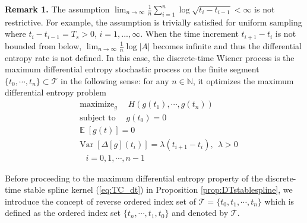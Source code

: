 \documentclass{article}
\DeclareMathOperator*{\maximize}{maximize}
\DeclareMathOperator*{\subj}{subject \  to}
\DeclareMathOperator*{\var}{Var}
\newcommand{\E}{\mathop{\mathbb E}}
\begin{document}
\noindent\textbf{Remark 1.} The assumption $\lim_{n \rightarrow \infty}\frac{1}{n}\sum_{i=1}^n \log \sqrt{t_{i}-t_{i-1}}\allowbreak < \infty$ is not restrictive. 
For example, the assumption is trivially satisfied for uniform sampling where  $t_i-t_{i-1}=T_s>0$, $i=1,...,\infty$. 
When the time increment $ t_{i+1}-t_{i}$
is not bounded from below, $\lim_{n\rightarrow \infty}\frac{1}{n}
\log|A|$ becomes infinite and thus the differential entropy rate is
not defined. In this case, the discrete-time Wiener process is the
maximum differential entropy stochastic process on the finite
segment $\{t_0,\cdots,t_n\}\subset \mathcal{T}$ in the following
sense: for any $n\in\mathbb N$, it optimizes the maximum
differential entropy problem
\begin{equation}
\label{eq:maxEntWiener_reduced}
 \begin{aligned}
& \maximize_g
 \quad H(g(t_1),\cdots, g(t_n))\\
& \subj
  \quad g(t_0)=0\\
&\E[g(t)]=0\\
& \var\left[\Delta[g](t_i)\right]=\lambda (t_{i+1}-t_{i}),\ \  \lambda>0   \\
& \quad i=0,1,\cdots,n-1
\end{aligned}
\end{equation}



Before proceeding to the maximum differential entropy  property of
the discrete-time stable spline kernel (\ref{eq:TC_dt}) in
Proposition \ref{prop:DTstablespline}, we introduce the concept of
reverse ordered index set of $\mathcal T=\{t_0,t_1,\cdots,t_n\}$
which is defined as the ordered index set $\{t_n,\cdots, t_1,t_0\}$
and denoted by $\overline{\mathcal T}$.
\end{document}

